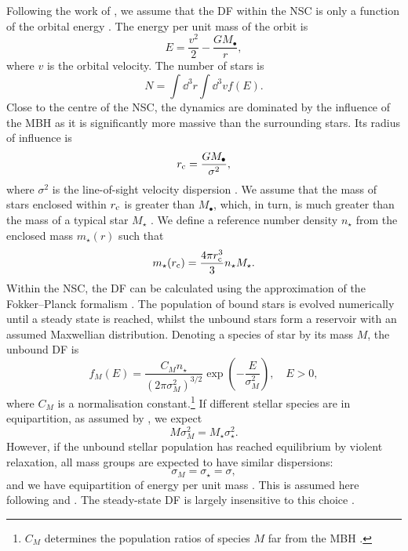 Following the work of \citet{Bahcall1976, Bahcall1977}, we assume that the DF within the NSC is only a function of the orbital energy \citep{Shapiro1978}. The energy per unit mass of the orbit is
\begin{equation}
E = \dfrac{v^2}{2} - \dfrac{GM_\bullet}{r},
\end{equation}
where $v$ is the orbital velocity. The number of stars is
\begin{equation}
N = \int \dd^3r \int \dd^3v f(E).
\end{equation}
Close to the centre of the NSC, the dynamics are dominated by the influence of the MBH as it is significantly more massive than the surrounding stars. Its radius of influence is
\begin{equation}
r_\mathrm{c} = \dfrac{GM_\bullet}{\sigma^2},
\label{eq:r_c}
\end{equation}
where $\sigma^2$ is the line-of-sight velocity dispersion \citep{Frank1976}. We assume that the mass of stars enclosed within $r_\mathrm{c}$ is greater than $M_\bullet$, which, in turn, is much greater than the mass of a typical star $M_\star$ \citep{Bahcall1976}. We define a reference number density $n_\star$ from the enclosed mass $m_\star(r)$ such that
\begin{equation}
m_\star(r_\mathrm{c}) = \dfrac{4\pi r_\mathrm{c}^3}{3}n_\star M_\star.
\end{equation}
Within the NSC, the DF can be calculated using the approximation of the Fokker--Planck formalism \citep[section 7.4]{Binney2008}. The population of bound stars is evolved numerically until a steady state is reached, whilst the unbound stars form a reservoir with an assumed Maxwellian distribution. Denoting a species of star by its mass $M$, the unbound DF is
\begin{equation}
f_M(E) = \dfrac{C_M n_\star}{(2\pi\sigma_M^2)^{3/2}} \exp\left(-\dfrac{E}{\sigma_M^2}\right),\quad E > 0,
\label{eq:Unbound_DF}
\end{equation}
where $C_M$ is a normalisation constant.\footnote{$C_M$ determines the population ratios of species $M$ far from the MBH \citep{Alexander2009}.} If different stellar species are in equipartition, as assumed by \citet{Bahcall1976, Bahcall1977}, we expect
\begin{equation}
M \sigma_M^2 = M_\star \sigma_\star^2.
\end{equation}
However, if the unbound stellar population has reached equilibrium by violent relaxation, all mass groups are expected to have similar dispersions:
\begin{equation}
\sigma_M = \sigma_\star = \sigma,
\end{equation}
and we have equipartition of energy per unit mass \citep{Lynden-Bell1967}. This is assumed here following \citet{Alexander2009} and \citet{O'Leary2009}. The steady-state DF is largely insensitive to this choice \citep{Bahcall1977, Alexander2009}.

